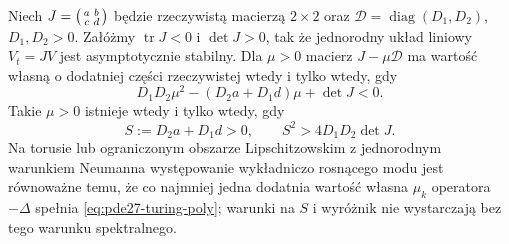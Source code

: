 \begin{twierdzenie}
\label{thm:pde27-turing-general}
Niech $J=\begin{psmallmatrix}a&b\\c&d\end{psmallmatrix}$
będzie rzeczywistą macierzą $2\times2$ oraz
$\mathcal D=\operatorname{diag}(D_1,D_2)$, $D_1,D_2>0$.
Załóżmy $\operatorname{tr}J<0$ i $\det J>0$,
tak że jednorodny układ liniowy $V_t=JV$ jest
asymptotycznie stabilny. Dla $\mu>0$ macierz
$J-\mu\mathcal D$ ma wartość własną o dodatniej
części rzeczywistej wtedy i tylko wtedy, gdy
\begin{equation}\label{eq:pde27-turing-poly}
 D_1D_2\mu^2-(D_2a+D_1d)\mu+\det J<0.
\end{equation}
Takie $\mu>0$ istnieje wtedy i tylko wtedy, gdy
\[
 S:=D_2a+D_1d>0,\qquad S^2>4D_1D_2\det J.
\]
Na torusie lub ograniczonym obszarze Lipschitzowskim
z jednorodnym warunkiem Neumanna występowanie
wykładniczo rosnącego modu jest równoważne temu,
że co najmniej jedna dodatnia wartość własna
$\mu_k$ operatora $-\Delta$ spełnia
\eqref{eq:pde27-turing-poly}; warunki na $S$ i wyróżnik
nie wystarczają bez tego warunku spektralnego.
\end{twierdzenie}
